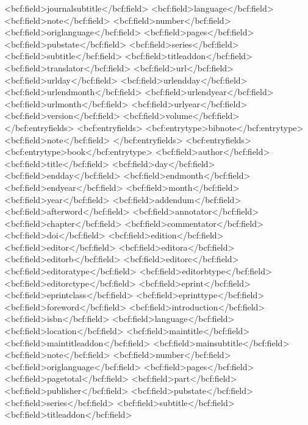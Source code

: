       <bcf:field>journalsubtitle</bcf:field>
      <bcf:field>language</bcf:field>
      <bcf:field>note</bcf:field>
      <bcf:field>number</bcf:field>
      <bcf:field>origlanguage</bcf:field>
      <bcf:field>pages</bcf:field>
      <bcf:field>pubstate</bcf:field>
      <bcf:field>series</bcf:field>
      <bcf:field>subtitle</bcf:field>
      <bcf:field>titleaddon</bcf:field>
      <bcf:field>translator</bcf:field>
      <bcf:field>url</bcf:field>
      <bcf:field>urlday</bcf:field>
      <bcf:field>urlendday</bcf:field>
      <bcf:field>urlendmonth</bcf:field>
      <bcf:field>urlendyear</bcf:field>
      <bcf:field>urlmonth</bcf:field>
      <bcf:field>urlyear</bcf:field>
      <bcf:field>version</bcf:field>
      <bcf:field>volume</bcf:field>
    </bcf:entryfields>
    <bcf:entryfields>
      <bcf:entrytype>bibnote</bcf:entrytype>
      <bcf:field>note</bcf:field>
    </bcf:entryfields>
    <bcf:entryfields>
      <bcf:entrytype>book</bcf:entrytype>
      <bcf:field>author</bcf:field>
      <bcf:field>title</bcf:field>
      <bcf:field>day</bcf:field>
      <bcf:field>endday</bcf:field>
      <bcf:field>endmonth</bcf:field>
      <bcf:field>endyear</bcf:field>
      <bcf:field>month</bcf:field>
      <bcf:field>year</bcf:field>
      <bcf:field>addendum</bcf:field>
      <bcf:field>afterword</bcf:field>
      <bcf:field>annotator</bcf:field>
      <bcf:field>chapter</bcf:field>
      <bcf:field>commentator</bcf:field>
      <bcf:field>doi</bcf:field>
      <bcf:field>edition</bcf:field>
      <bcf:field>editor</bcf:field>
      <bcf:field>editora</bcf:field>
      <bcf:field>editorb</bcf:field>
      <bcf:field>editorc</bcf:field>
      <bcf:field>editoratype</bcf:field>
      <bcf:field>editorbtype</bcf:field>
      <bcf:field>editorctype</bcf:field>
      <bcf:field>eprint</bcf:field>
      <bcf:field>eprintclass</bcf:field>
      <bcf:field>eprinttype</bcf:field>
      <bcf:field>foreword</bcf:field>
      <bcf:field>introduction</bcf:field>
      <bcf:field>isbn</bcf:field>
      <bcf:field>language</bcf:field>
      <bcf:field>location</bcf:field>
      <bcf:field>maintitle</bcf:field>
      <bcf:field>maintitleaddon</bcf:field>
      <bcf:field>mainsubtitle</bcf:field>
      <bcf:field>note</bcf:field>
      <bcf:field>number</bcf:field>
      <bcf:field>origlanguage</bcf:field>
      <bcf:field>pages</bcf:field>
      <bcf:field>pagetotal</bcf:field>
      <bcf:field>part</bcf:field>
      <bcf:field>publisher</bcf:field>
      <bcf:field>pubstate</bcf:field>
      <bcf:field>series</bcf:field>
      <bcf:field>subtitle</bcf:field>
      <bcf:field>titleaddon</bcf:field>
